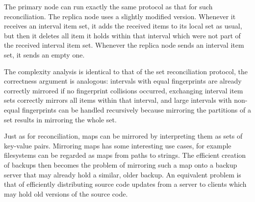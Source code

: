 The primary node can run exactly the same protocol as that for such reconciliation. The replica node uses a slightly modified version. Whenever it receives an interval item set, it adds the received items to its local set as usual, but then it deletes all item it holds within that interval which were not part of the received interval item set. Whenever the replica node sends an interval item set, it sends an empty one.

The complexity analysis is identical to that of the set reconciliation protocol, the correctness argument is analogous: intervals with equal fingerprints are already correctly mirrored if no fingerprint collisions occurred, exchanging interval item sets correctly mirrors all items within that interval, and large intervals with non-equal fingerprints can be handled recursively because mirroring the partitions of a set results in mirroring the whole set.

Just as for reconciliation, maps can be mirrored by interpreting them as sets of key-value pairs. Mirroring maps has some interesting use cases, for example filesystems can be regarded as maps from paths to strings. The efficient creation of backups then becomes the problem of mirroring such a map onto a backup server that may already hold a similar, older backup. An equivalent problem is that of efficiently distributing source code updates from a server to clients which may hold old versions of the source code.
